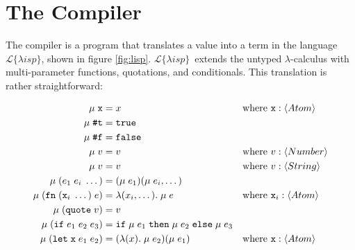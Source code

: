 \documentclass[a4paper]{article}
\newcommand{\lisp}{\ensuremath{\mathcal{L}\{\lambda isp\}}}
\begin{document}
\section{The Compiler}

The compiler is a program that translates a value into a term in the language \lisp, shown in figure \ref{fig:lisp}. \lisp\ extends the untyped $\lambda$-calculus with multi-parameter functions, quotations, and conditionals. This translation is rather straightforward:

$$
\begin{aligned}
\mu\;\mathtt{x} &= x && \text{where $\mathtt{x} : \langle Atom \rangle$} \\
\mu\;\hbox{\texttt{\#}}\mathtt{t} &= \mathtt{true} \\
\mu\;\hbox{\texttt{\#}}\mathtt{f} &= \mathtt{false} \\
\mu\;v &= v && \text{where $v : \langle Number \rangle$} \\
\mu\;v &= v && \text{where $v : \langle String \rangle$} \\
\mu\;\mathtt{(} e_1\;e_i\;\dots \mathtt{)} &= (\mu\;e_1)(\mu\;e_i, \dots) \\
\mu\;\mathtt{(} \mathtt{fn}\;(\mathtt{x}_i\; \dots)\;e \mathtt{)} &= \lambda(x_i, \dots).\;\mu\;e && \text{where $\mathtt{x}_i : \langle Atom \rangle$} \\
\mu\;\mathtt{(} \mathtt{quote}\;v \mathtt{)} &= v \\
\mu\;\mathtt{(} \mathtt{if}\;e_1\;e_2\;e_3 \mathtt{)} &= \mathtt{if}\;\mu\;e_1\;\mathtt{then}\;\mu\;e_2\;\mathtt{else}\;\mu\;e_3 \\
\mu\;\mathtt{(} \mathtt{let}\;\mathtt{x}\;e_1\;e_2 \mathtt{)} &= (\lambda(x).\;\mu\;e_2)(\mu\;e_1) && \text{where $\mathtt{x} : \langle Atom \rangle$} \\
\end{aligned}
$$
\end{document}
